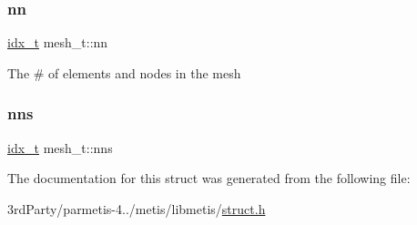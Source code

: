 \mbox{\label{structmesh__t_a6321957b37b2040997c84db2fd2b8427}} 
\subsubsection{\texorpdfstring{nn}{nn}}
{\footnotesize\ttfamily \hyperlink{3rd_party_2parmetis-4_80_83_2metis_2include_2metis_8h_aaa5262be3e700770163401acb0150f52}{idx\+\_\+t} mesh\+\_\+t\+::nn}

The \# of elements and nodes in the mesh \mbox{\label{structmesh__t_abf9cfafc4af9ca5ac76785bc2c849780}} 
\subsubsection{\texorpdfstring{nns}{nns}}
{\footnotesize\ttfamily \hyperlink{3rd_party_2parmetis-4_80_83_2metis_2include_2metis_8h_aaa5262be3e700770163401acb0150f52}{idx\+\_\+t} mesh\+\_\+t\+::nns}



The documentation for this struct was generated from the following file\+:\begin{DoxyCompactItemize}
\item 
3rd\+Party/parmetis-\/4../metis/libmetis/\hyperlink{metis_2libmetis_2struct_8h}{struct.\+h}\end{DoxyCompactItemize}
